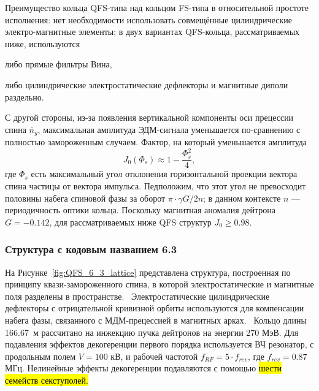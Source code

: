 Преимущество кольца QFS-типа над кольцом FS-типа в относительной простоте исполнения: нет необходимости использовать совмещённые цилиндрические электро-магнитные элементы; в двух вариантах QFS-кольца, рассматриваемых ниже, используются 
\begin{enumerate*}
\item либо прямые фильтры Вина, 
\item либо цилиндрические электростатические дефлекторы и магнитные диполи раздельно.
\end{enumerate*}
С другой стороны, из-за появления вертикальной компоненты оси прецессии спина $\bar n_y$, максимальная амплитуда ЭДМ-сигнала уменьшается по-сравнению с полностью замороженным случаем. Фактор, на который уменьшается амплитуда~\cite{Senichev:QFS_IPAC15}
\[
J_0(\Phi_s) \approx 1 - \frac{\Phi_s^2}{4},
\]
где $\Phi_s$ есть максимальный угол отклонения горизонтальной проекции вектора спина частицы от вектора импульса. Педположим, что этот угол не превосходит половины набега спиновой фазы за оборот $\pi\cdot \gamma G/2n$; в данном контексте $n$ --- периодичность оптики кольца. Поскольку магнитная аномалия дейтрона $G = -0.142$, для рассматриваемых ниже QFS структур $J_0\ge 0.98$.

\subsubsection{Структура с кодовым названием 6.3}\label{chpt2:lattice:QFS:6_3}

На Рисунке~\ref{fig:QFS_6_3_lattice} представлена структура, построенная по принципу квази-замороженного спина, в которой электростатические и магнитные поля разделены в пространстве.~\cite{Senichev:Lattices} Электростатические цилиндрические дефлекторы с отрицательной кривизной орбиты используются для компенсации набега фазы, связанного с МДМ-прецессией в магнитных арках.~\cite{Senichev:QFS_IPAC15} Кольцо длины 166.67~м рассчитано на инжекцию пучка дейтронов на энергии 270 МэВ. Для подавления эффектов декогеренции первого порядка используется ВЧ резонатор, с продольным полем $V = 100$ кВ, и рабочей частотой $f_{RF} = 5\cdot f_{rev}$, где $f_{rev} = 0.87$ МГц. Нелинейные эффекты декогеренции подавляются с помощью \hl{шести семейств секступолей.}

